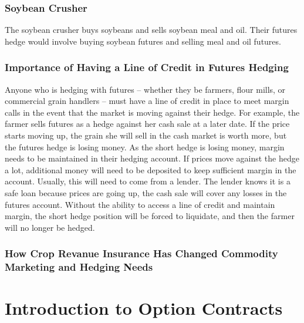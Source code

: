 \documentclass[
]{book}
\begin{document}
\hypertarget{soybean-crusher}{%
\subsection{Soybean Crusher}\label{soybean-crusher}}

The soybean crusher buys soybeans and sells soybean meal and oil. Their futures hedge would involve buying soybean futures and selling meal and oil futures.

\hypertarget{importance-of-having-a-line-of-credit-in-futures-hedging}{%
\subsection{Importance of Having a Line of Credit in Futures Hedging}\label{importance-of-having-a-line-of-credit-in-futures-hedging}}

Anyone who is hedging with futures -- whether they be farmers, flour mills, or commercial grain handlers -- must have a line of credit in place to meet margin calls in the event that the market is moving against their hedge. For example, the farmer sells futures as a hedge against her cash sale at a later date. If the price starts moving up, the grain she will sell in the cash market is worth more, but the futures hedge is losing money. As the short hedge is losing money, margin needs to be maintained in their hedging account. If prices move against the hedge a lot, additional money will need to be deposited to keep sufficient margin in the account. Usually, this will need to come from a lender. The lender knows it is a safe loan because prices are going up, the cash sale will cover any losses in the futures account. Without the ability to access a line of credit and maintain margin, the short hedge position will be forced to liquidate, and then the farmer will no longer be hedged.

\hypertarget{how-crop-revanue-insurance-has-changed-commodity-marketing-and-hedging-needs}{%
\subsection{How Crop Revanue Insurance Has Changed Commodity Marketing and Hedging Needs}\label{how-crop-revanue-insurance-has-changed-commodity-marketing-and-hedging-needs}}

\hypertarget{introduction-to-option-contracts}{%
\chapter{Introduction to Option Contracts}\label{introduction-to-option-contracts}}
\end{document}
